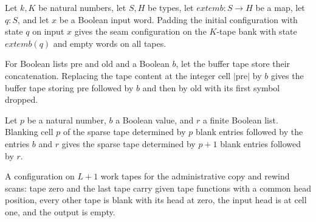 \begin{lemma}
\label{Complexity.enumCont_pad_init}
\leanok
{}
Let $k,K$ be natural numbers, let $S,H$ be types, let $	ext{emb}:S\to H$ be a map, let
$q:S$, and let $x$ be a Boolean input word. Padding the initial configuration with state
$q$ on input $x$ gives the seam configuration on the $K$-tape bank with state
$	ext{emb}(q)$ and empty words on all tapes.
\end{lemma}

\begin{lemma}
\label{Complexity.enumCont_overwrite}
\leanok
{}
For Boolean lists $\mathrm{pre}$ and $\mathrm{old}$ and a Boolean $b$, let the buffer
tape store their concatenation. Replacing the tape content at the integer cell
$|\mathrm{pre}|$ by $b$ gives the buffer tape storing $\mathrm{pre}$ followed by $b$ and
then by $\mathrm{old}$ with its first symbol dropped.
\end{lemma}

\begin{lemma}
\label{Complexity.enumCont_sparse_clear}
\leanok
{}
Let $p$ be a natural number, $b$ a Boolean value, and $r$ a finite Boolean list.
Blanking cell $p$ of the sparse tape determined by $p$ blank entries followed by the
entries $b$ and $r$ gives the sparse tape determined by $p+1$ blank entries followed by
$r$.
\end{lemma}

\begin{definition}
\label{Complexity.enumCont_pairCfg}
\leanok
{}
A configuration on $L + 1$ work tapes for the administrative copy and rewind
scans: tape zero and the last tape carry given tape functions with a common head
position, every other tape is blank with its head at zero, the input head is at
cell one, and the output is empty.
\end{definition}

